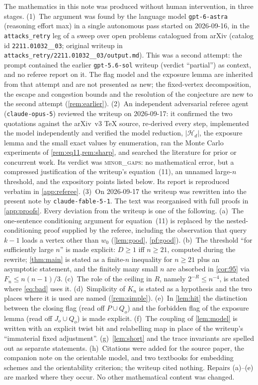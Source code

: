 \documentclass[11pt,a4paper]{article}
\theoremstyle{plain}
\theoremstyle{definition}
\theoremstyle{remark}
\newcommand{\cH}{\mathcal H}
\begin{document}
The mathematics in this note was produced without human intervention, in three stages.
(1)~The argument was found by the language model \texttt{gpt-6-astra} (reasoning effort max) in a single autonomous pass started on 2026-09-16, in the \texttt{attacks\_retry} leg of a sweep over open problems catalogued from arXiv (catalog id \texttt{2211.01032\_\_03}; original writeup in \texttt{attacks\_retry/2211.01032\_\_03/output.md}). This was a second attempt: the prompt contained the earlier \texttt{gpt-5.6-sol} writeup (verdict ``partial'') as context, and no referee report on it. The flag model and the exposure lemma are inherited from that attempt and are not presented as new; the fixed-vertex decomposition, the escape and congestion bounds and the resolution of the conjecture are new to the second attempt (\cref{rem:earlier}).
(2)~An independent adversarial referee agent (\texttt{claude-opus-5}) reviewed the writeup on 2026-09-17: it confirmed the two quotations against the arXiv~v3 \TeX{} source, re-derived every step, implemented the model independently and verified the model reduction, $|\cH_d|$, the exposure lemma and the small exact values by enumeration, ran the Monte Carlo experiments of \cref{rem:eq11,rem:sharp}, and searched the literature for prior or concurrent work. Its verdict was \textsc{minor\_gaps}: no mathematical error, but a compressed justification of the writeup's equation~(11), an unnamed large-$n$ threshold, and the expository points listed below. Its report is reproduced verbatim in \cref{app:referee}.
(3)~On 2026-09-17 the writeup was rewritten into the present note by \texttt{claude-fable-5-1}. The text was reorganised with full proofs in \cref{app:proofs}. Every deviation from the writeup is one of the following. (a)~The one-sentence conditioning argument for equation~(11) is replaced by the nested-conditioning proof supplied by the referee, including the observation that query $k-1$ loads a vertex other than $w_0$ (\cref{lem:good}, \cref{pf:good}). (b)~The threshold ``for sufficiently large $n$'' is made explicit: $D\ge1$ iff $n\ge21$, computed during the rewrite; \cref{thm:main} is stated as a finite-$n$ inequality for $n\ge21$ plus an asymptotic statement, and the finitely many small $n$ are absorbed in \cref{cor:95} via $F_n\le n(n-1)/3$. (c)~The role of the ceiling in $R$, namely $2^{-R}\le n^{-4}$, is stated where \eqref{eq:bad} uses it. (d)~Simplicity of $K_n$ is stated as a hypothesis and the two places where it is used are named (\cref{rem:simple}). (e)~In \cref{lem:hit} the distinction between the closing flag (read off $P\cup Q_o$) and the forbidden flag of the exposure lemma (read off $J_o\cup Q_o$) is made explicit. (f)~The coupling of \cref{lem:model} is written with an explicit twist bit and relabelling map in place of the writeup's ``immaterial fixed adjustment''. (g)~\cref{lem:short} and the trace invariants are spelled out as separate statements. (h)~Citations were added for the source paper, the companion note \cite{Note02} on the orientable model, and two textbooks \cite{MT01,GT87} for embedding schemes and the orientability criterion; the writeup cited nothing. Repairs (a)--(e) are marked where they occur. No other mathematical content was changed.
\end{document}
